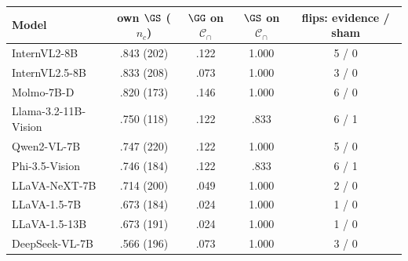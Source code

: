 \begin{tabular}{@{}lcccc@{}}
\toprule
Model & own $\GS$ ($n_c$) & $\GG$ on $\mathcal{C}_\cap$ & $\GS$ on $\mathcal{C}_\cap$ & flips: evidence / sham \\
\midrule
InternVL2-8B & .843 (202) & .122 & 1.000 & 5 / 0 \\
InternVL2.5-8B & .833 (208) & .073 & 1.000 & 3 / 0 \\
Molmo-7B-D & .820 (173) & .146 & 1.000 & 6 / 0 \\
Llama-3.2-11B-Vision & .750 (118) & .122 & .833 & 6 / 1 \\
Qwen2-VL-7B & .747 (220) & .122 & 1.000 & 5 / 0 \\
Phi-3.5-Vision & .746 (184) & .122 & .833 & 6 / 1 \\
LLaVA-NeXT-7B & .714 (200) & .049 & 1.000 & 2 / 0 \\
LLaVA-1.5-7B & .673 (184) & .024 & 1.000 & 1 / 0 \\
LLaVA-1.5-13B & .673 (191) & .024 & 1.000 & 1 / 0 \\
DeepSeek-VL-7B & .566 (196) & .073 & 1.000 & 3 / 0 \\
\bottomrule
\end{tabular}
